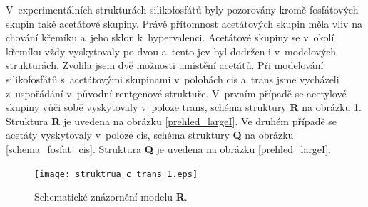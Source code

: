\documentclass[
digital, %
table,   %
nolof,     %
nolot,     %
oneside,
]{fithesis3}
\begin{document}
V~experimentálních strukturách silikofosfátů byly pozorovány kromě fosfátových skupin také acetátové skupiny. Právě přítomnost acetátových skupin měla vliv na chování křemíku a~jeho sklon k~hypervalenci. Acetátové skupiny se v~okolí křemíku vždy vyskytovaly po dvou a~tento jev byl dodržen i v~modelových strukturách. Zvolila jsem dvě možnosti umístění acetátů. Při modelování silikofosfátů s~acetátovými skupinami v~polohách cis a~trans jsme vycházeli z~uspořádání v~původní rentgenové struktuře. V~prvním případě se acetylové skupiny vůči sobě vyskytovaly v~poloze trans, schéma struktury \textbf{R} na obrázku \ref{schema_fosfat_trans}. Struktura \textbf{R} je uvedena na obrázku \ref{prehled_largeI}. Ve druhém případě se acetáty vyskytovaly v~poloze cis, schéma struktury \textbf{Q} na obrázku \ref{schema_fosfat_cis}. Struktura \textbf{Q} je uvedena na obrázku \ref{prehled_largeI}.
\begin{figure}\begin{center}\texttt{[image: struktrua\_c\_trans\_1.eps]}
\caption{Schematické znázornění modelu \textbf{R}.}\label{schema_fosfat_trans}
\end{center}\end{figure}
\end{document}
